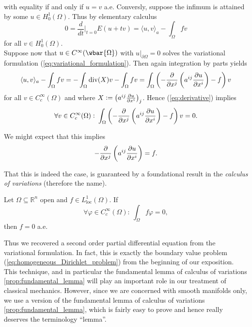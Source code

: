 \noindent with equality if and only if $u = v$ a.e. Conversly, suppose the infimum is attained by some $u \in H^1_0(\Omega)$. Thus by elementary calculus
\begin{equation}
	\label{eq:derivative}
	0 = \frac{d}{dt}\bigg\vert_{t = 0} E(u + tv) = \langle u, v \rangle_a - \int_\Omega f v
\end{equation}
\noindent for all $v \in H^1_0(\Omega)$.\\
Suppose now that $u \in C^\infty(\wbar{\Omega})$ with $u\vert_{\partial \Omega} = 0$ solves the variational formulation (\ref{eq:variational_formulation}). Then again integration by parts yields
\begin{equation*}
	\langle u, v \rangle_a - \int_\Omega f v = -\int_\Omega \mathrm{div}(X) v - \int_\Omega fv = \int_\Omega \del[3]{-\frac{\partial}{\partial x^j}\del[3]{a^{ij}\frac{\partial u}{\partial x^i}} - f} v
\end{equation*}
\noindent for all $v \in C^\infty_c(\Omega)$ and where $X := \del[1]{a^{ij}\frac{\partial u}{\partial x^i}}_j$. Hence (\ref{eq:derivative}) implies 
\begin{equation*}
	\forall v \in C^\infty_c(\Omega): \> \int_\Omega \del[3]{-\frac{\partial}{\partial x^j}\del[3]{a^{ij}\frac{\partial u}{\partial x^i}} - f} v = 0.
\end{equation*}

We might expect that this implies 
\begin{equation*}
	-\frac{\partial}{\partial x^j}\del[3]{a^{ij}\frac{\partial u}{\partial x^i}} = f.
\end{equation*}

That this is indeed the case, is guaranteed by a foundational result in the \emph{calculus of variations} (therefore the name).

\begin{proposition}
	\label{prop:fundamental_lemma}
	Let $\Omega \subseteq \mathbb{R}^n$ open and $f \in L^1_{\mathrm{loc}}(\Omega)$. If
	\begin{equation*}
		\forall \varphi \in C^\infty_c(\Omega): \> \int_\Omega f\varphi = 0,
	\end{equation*}
	\noindent then $f = 0$ a.e.
\end{proposition}

Thus we recovered a second order partial differential equation from the variational formulation. In fact, this is exactly the boundary value problem (\ref{eq:homogeneous_Dirichlet_problem}) from the beginning of our exposition. This technique, and in particular the fundamental lemma of calculus of variations \ref{prop:fundamental_lemma} will play an important role in our treatment of classical mechanics. However, since we are concerned with smooth manifolds only, we use a version of the fundamental lemma of calculus of variations \ref{prop:fundamental_lemma}, which is fairly easy to prove and hence really deserves the terminology ``lemma''.

